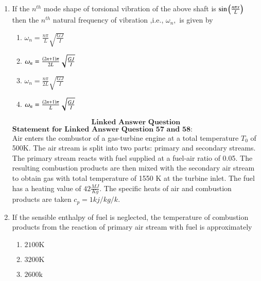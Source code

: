 \documentclass[journal]{IEEEtran}
\begin{document}
\begin{enumerate}[start=49]
\begin{multicols}{2}
\begin{enumerate}
        \item $\theta\brak{0}=0 \text{ and } \theta\brak{L}=0$
        \item $\frac{\partial \theta}{\partial x} \bigg|_{x=0}=0 \text{ and } \theta\brak{L}=0$
        \item $\theta\brak{0}=0 \text{ and } \frac{\partial \theta}{\partial x} \bigg|_{x=L}=0$        
    \end{enumerate}
\end{multicols}    
\bigskip
\item If the $n^{th}$ mode shape of torsional vibration of the above shaft is $\sin\left(\frac{n\pi x}{L}\right)$ then the $n^{th}$ natural frequency of vibration ,i.e., $\omega_{n},$ is given by 
\begin{multicols}{2}
    \begin{enumerate}
        \item $\omega_{n}=\frac{n\pi}{L}\sqrt{\frac{GJ}{I}}$
        \item $\omega_{n}=\frac{\left(2n+1\right)\pi}{2L}\sqrt{\frac{GJ}{I}}$
        \item $\omega_{n}=\frac{n\pi}{2L}\sqrt{\frac{GJ}{I}}$
        \item $\omega_{n}=\frac{\left(2n+1\right)\pi}{L}\sqrt{\frac{GJ}{I}}$        
    \end{enumerate}
\end{multicols}    
\bigskip
$$\textbf{Linked Answer Question}$$
$\textbf{Statement for Linked Answer Question 57 and 58:}$\\
Air enters the combustor of a gas-turbine engine at a total temperature $T_{0}$ of 500K. The air stream is split into two parts: primary and secondary streams. The primary stream reacts with fuel supplied at a fuel-air ratio of 0.05. The resulting combustion products are then mixed with the secondary air stream to obtain gas with total temperature of 1550 K at the turbine inlet. The fuel has a heating value of $42 \frac{MJ}{Kg}.$ The specific heats of air and combustion products are taken $c_{p}=1kj/kg/k.$\bigskip
\item If the sensible enthalpy of fuel is neglected, the temperature of combustion products from the reaction of primary air stream with fuel is approximately
\begin{multicols}{4}
    \begin{enumerate}
        \item $2100\text{K}$
        \item $3200\text{K}$
        \item $2600\text{k}$

\end{enumerate}
\end{multicols}
\end{enumerate}
\end{document}
